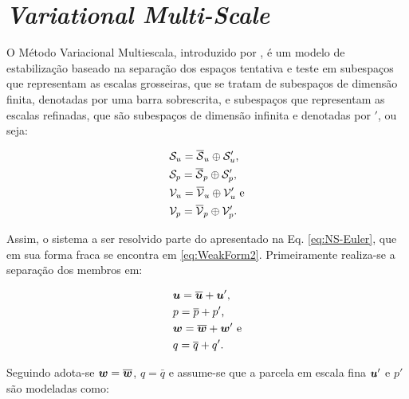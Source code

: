 \section{\textit{Variational Multi-Scale}} \label{VMS}

O Método Variacional Multiescala, introduzido por , é um modelo de estabilização baseado na separação dos espaços tentativa e teste em subespaços que representam as escalas grosseiras, que se tratam de subespaços de dimensão finita, denotadas por uma barra sobrescrita, e subespaços que representam as escalas refinadas, que são subespaços de dimensão infinita e denotadas por $'$, ou seja:

\begin{subequations}
    \begin{align}
         & \mathcal{S}_u=\overline{\mathcal{S}}_u\oplus\mathcal{S}'_u\text{,}  \\
         & \mathcal{S}_p=\overline{\mathcal{S}}_p\oplus\mathcal{S}'_p\text{,}  \\
         & \mathcal{V}_u=\overline{\mathcal{V}}_u\oplus\mathcal{V}'_u\text{ e} \\
         & \mathcal{V}_p=\overline{\mathcal{V}}_p\oplus\mathcal{V}'_p\text{.}
    \end{align}
\end{subequations}

Assim, o sistema a ser resolvido parte do apresentado na Eq. \eqref{eq:NS-Euler}, que em sua forma fraca se encontra em \eqref{eq:WeakForm2}. Primeiramente realiza-se a separação dos membros em:

\begin{subequations}
    \begin{align}
         & \boldsymbol{u}=\overline{\boldsymbol{u}}+\boldsymbol{u}'\text{,}  \\
         & p=\overline{p}+p'\text{,}            \\
         & \boldsymbol{w}=\overline{\boldsymbol{w}}+\boldsymbol{w}'\text{ e} \\
         & q=\overline{q}+q'\text{.}
    \end{align}
\end{subequations}

Seguindo  adota-se $\boldsymbol{w}=\overline{\boldsymbol{w}}$, $q=\bar{q}$ e assume-se que a parcela em escala fina $\boldsymbol{u}'$ e $p'$ são modeladas como:

